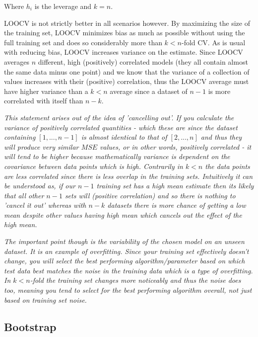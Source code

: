 Where $h_{i}$ is the leverage and $k=n$.

LOOCV is not strictly better in all scenarios however. By maximizing the size of the training set, LOOCV minimizes bias as much as possible without using the full training set and does so considerably more than $k<n$-fold CV. As is usual with reducing bias, LOOCV increases variance on the estimate. Since LOOCV averages $n$ different, high (positively) correlated models (they all contain almost the same data minus one point) and we know that the variance of a collection of values increases with their (positive) correlation, thus the LOOCV average must have higher variance than a $k<n$ average since a dataset of $n-1$ is more correlated with itself than $n-k$.

\textit{This statement arises out of the idea of 'cancelling out'. If you calculate the variance of positively correlated quantities - which these are since the dataset containing $[1,...,n-1]$ is almost identical to that of $[2,...,n]$ and thus they will produce very similar $MSE$ values, or in other words, positively correlated - it will tend to be higher because mathematically variance is dependent on the covariance between data points which is high. Contrarily in $k<n$ the data points are less correlated since there is less overlap in the training sets. Intuitively it can be understood as, if our $n-1$ training set has a high mean estimate then its likely that all other $n-1$ sets will (positive correlation) and so there is nothing to 'cancel it out' whereas with $n-k$ datasets there is more chance of getting a low mean despite other values having high mean which cancels out the effect of the high mean.}

\textit{The important point though is the variability of the chosen model on an unseen dataset. It is an example of overfitting. Since your training set effectively doesn't change, you will select the best performing algorithm/parameter based on which test data best matches the noise in the training data which is a type of overfitting. In $k<n$-fold the training set changes more noticeably and thus the noise does too, meaning you tend to select for the best performing algorithm overall, not just based on training set noise.}

\subsection{Bootstrap}


